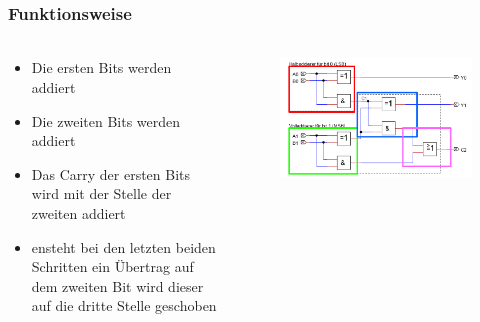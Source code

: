 \begin{frame}
    \frametitle{Funktionsweise}
    \framesubtitle{}
     \begin{columns}[c]
            \begin{block}{}
                \begin{itemize}
                    \item Die ersten Bits werden addiert
                    \item Die zweiten Bits werden addiert
                    \item Das Carry der ersten Bits wird mit der Stelle der
                    zweiten addiert
                    \item ensteht bei den letzten beiden Schritten ein Übertrag
                    auf dem zweiten Bit wird dieser auf die dritte Stelle
                    geschoben
                \end{itemize}
            \end{block}
            \begin{figure}[H]
            \begin{center}
                    \includegraphics[scale=0.4]{./img/schaltung/Volladdierer_fun_4.png}
            \end{center}
            \end{figure}
     \end{columns}
\end{frame}
